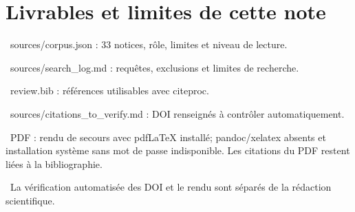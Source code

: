 \documentclass[10pt,a4paper]{article}
\begin{document}
\section{Livrables et limites de cette note}

\par\noindent\textbullet\ sources/corpus.json : 33 notices, r\^{o}le, limites et niveau de lecture.
\par\noindent\textbullet\ sources/search\_log.md : requ\^{e}tes, exclusions et limites de recherche.
\par\noindent\textbullet\ review.bib : r\'{e}f\'{e}rences utilisables avec citeproc.
\par\noindent\textbullet\ sources/citations\_to\_verify.md : DOI renseign\'{e}s \`{a} contr\^{o}ler automatiquement.
\par\noindent\textbullet\ PDF : rendu de secours avec pdfLaTeX install\'{e}; pandoc/xelatex absents et installation syst\`{e}me
  sans mot de passe indisponible. Les citations du PDF restent li\'{e}es \`{a} la bibliographie.
\par\noindent\textbullet\ La v\'{e}rification automatis\'{e}e des DOI et le rendu sont s\'{e}par\'{e}s de la r\'{e}daction scientifique.
\end{document}
